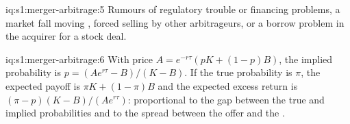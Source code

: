 \begin{solution}{iq:s1:merger-arbitrage:5}
Rumours of regulatory trouble or financing problems, a market fall moving , forced selling by other arbitrageurs, or a borrow problem in the
acquirer for a stock deal.
\end{solution}

\begin{solution}{iq:s1:merger-arbitrage:6}
With price $A = e^{-r\tau}(pK + (1 - p)B)$, the implied probability is $p = (Ae^{r\tau} - B)/(K - B)$. If the true probability is $\pi$, the expected payoff is
$\pi K + (1 - \pi)B$ and the expected excess return is $(\pi - p)(K - B)/(Ae^{r\tau})$: proportional to the gap between the true and implied probabilities
and to the spread between the offer and the .
\end{solution}
